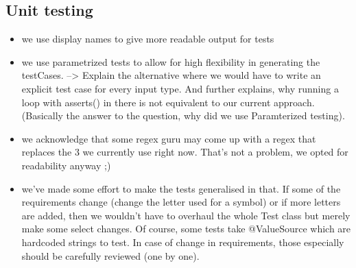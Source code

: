 \subsection{Unit testing}

\begin{itemize}
	\item we use display names to give more readable output for tests
	\item we use parametrized tests to allow for high flexibility in generating the testCases. --> Explain the alternative where we would have to write an explicit test case for every input type. And further explains, why running a loop with asserts() in there is not equivalent to our current approach. (Basically the answer to the question, why did we use Paramterized testing). 
	\item we acknowledge that some regex guru may come up with a regex that replaces the 3 we currently use right now. That's not a problem, we opted for readability anyway ;) 
	\item we've made some effort to make the tests generalised in that. If some of the requirements change (change the letter used for a symbol) or if more letters are added, then we wouldn't have to overhaul the whole Test class but merely make some select changes. Of course, some tests take @ValueSource which are hardcoded strings to test. In case of change in requirements, those especially should be carefully reviewed (one by one). 
\end{itemize}